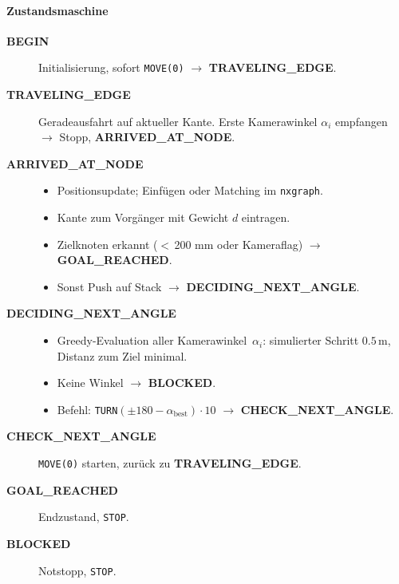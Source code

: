\documentclass[main.tex]{subfiles} %
\begin{document}
\paragraph{Zustandsmaschine}
\vspace{-0.3\baselineskip}
\begin{description}
  \item[\textbf{BEGIN}]
    Initialisierung, sofort \texttt{MOVE(0)} $\rightarrow$
    \textbf{TRAVELING\_EDGE}.

  \item[\textbf{TRAVELING\_EDGE}]
    Geradeausfahrt auf aktueller Kante.
    Erste Kamerawinkel $\alpha_i$ empfangen $\rightarrow$ Stopp,
    \textbf{ARRIVED\_AT\_NODE}.

  \item[\textbf{ARRIVED\_AT\_NODE}]
  \begin{itemize}\itemsep0pt
      \item Positionsupdate; Einfügen oder Matching im \texttt{nxgraph}.
      \item Kante zum Vorgänger mit Gewicht $d$ eintragen.
      \item Zielknoten erkannt ($<$\,200 mm oder Kameraflag)
        $\rightarrow$ \textbf{GOAL\_REACHED}.
      \item Sonst Push auf Stack $\rightarrow$ \textbf{DECIDING\_NEXT\_ANGLE}.
    \end{itemize}

  \item[\textbf{DECIDING\_NEXT\_ANGLE}]
  \begin{itemize}\itemsep0pt
      \item Greedy-Evaluation aller Kamerawinkel~$\alpha_i$:
        simulierter Schritt $0.5\,\mathrm{m}$, Distanz zum Ziel minimal.
      \item Keine Winkel $\rightarrow$ \textbf{BLOCKED}.
      \item Befehl: \texttt{TURN}$(\pm180-\alpha_{\text{best}})\cdot10$
        $\rightarrow$ \textbf{CHECK\_NEXT\_ANGLE}.
    \end{itemize}

  \item[\textbf{CHECK\_NEXT\_ANGLE}]
    \texttt{MOVE(0)} starten, zurück zu \textbf{TRAVELING\_EDGE}.

  \item[\textbf{GOAL\_REACHED}]
    Endzustand, \texttt{STOP}.

  \item[\textbf{BLOCKED}]
    Notstopp, \texttt{STOP}.
\end{description}
\end{document}
